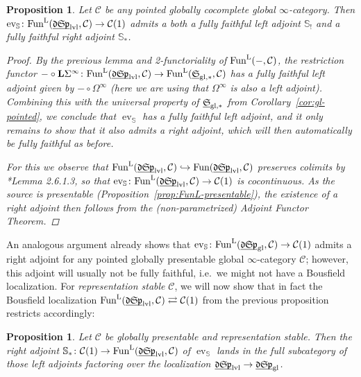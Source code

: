 \documentclass[reqno]{memo-l}
\theoremstyle{mythm}
\newtheorem{prop}[thm]{Proposition}
\theoremstyle{definition}
\numberwithin{equation}{section}
\newcommand{\Cc}{{\mathcal{C}}}
\newcommand{\gl}{\textup{gl}}
\DeclareMathOperator{\ev}{ev}
\newcommand{\Fun}{{\textup{Fun}}}
\newcommand{\cat}[1]{\textbf{\textup{#1}}}
\newcommand{\ulhelper}[2]{\underline{\setbox0=\hbox{$#1#2$}\dp0=0.4pt \box0\relax}}
\newcommand{\ul}[1]{{\mathpalette\ulhelper{#1}}\hbox{\rule[-2pt]{0pt}{0pt}}}
\newcommand{\mySp}{{\mathfrak S\kern-.5pt\mathfrak p}}
\newcommand{\myLSp}{{\mathfrak d\kern-.25pt}\mySp}
\newcommand{\ulmySplev}{\ul{\myLSp}_\textup{lvl}}
\newcommand{\myS}{{{\mathfrak S\kern-.4pt}}}
\begin{document}
\begin{prop}\label{prop:Sigma-oo-lev-ff}
    Let $\Cc$ be any pointed globally cocomplete global $\infty$-category. Then
    $\ev_{\mathbb S}\colon\Fun^\textup{L}(\ulmySplev,\Cc)\to\Cc(1)$ admits a both a fully faithful left adjoint $\mathbb S_!$ and a fully faithful right adjoint $\mathbb S_*$.
    \begin{proof}
        By the previous lemma and 2-functoriality of $\Fun^\text{L}(-,\Cc)$, the restriction functor $-\circ\cat{L}\Sigma^\infty\colon\Fun^\text{L}(\ulmySplev,\Cc)\to\Fun^\text{L}(\ul\myS_{\gl,*},\Cc)$ has a fully faithful left adjoint given by ${-}\circ\Omega^\infty$ (here we are using that $\Omega^\infty$ is also a \emph{left} adjoint). Combining this with the universal property of $\ul\myS_{\gl,*}$ from Corollary~\ref{cor:gl-pointed}, we conclude that $\ev_{\mathbb S}$ has a fully faithful left adjoint, and it only remains to show that it also admits a right adjoint, which will then automatically be fully faithful as before.

        For this we observe that $\Fun^\text{L}(\ulmySplev,\Cc)\hookrightarrow\Fun(\ulmySplev,\Cc)$ preserves colimits by \cite{martiniwolf2022presentable}*{Lemma 2.6.1.3}, so that $\ev_{\mathbb S}\colon\Fun^\text{L}(\ulmySplev,\Cc)\to\Cc(1)$ is cocontinuous. As the source is presentable (Proposition~\ref{prop:FunL-presentable}), the existence of a right adjoint then follows from the (non-parametrized) Adjoint Functor Theorem.
    \end{proof}
\end{prop}

An analogous argument already shows that $\ev_{\mathbb S}\colon\Fun^\text{L}(\ul\myLSp_\gl,\Cc)\to\Cc(1)$ admits a right adjoint for any pointed globally presentable global $\infty$-category $\Cc$; however, this adjoint will usually not be fully faithful, i.e.\ we might not have a Bousfield localization. For \emph{representation stable} $\Cc$, we will now show that in fact the Bousfield localization $\Fun^\text{L}(\ulmySplev,\Cc)\rightleftarrows\Cc(1)$ from the previous proposition restricts accordingly:

\begin{prop}\label{prop:RA-factor-through-LA}
    Let $\Cc$ be globally presentable and representation stable. Then the right adjoint $\mathbb S_*\colon\Cc(1)\to\Fun^\textup{L}(\ulmySplev,\Cc)$ of $\ev_{\mathbb S}$ lands in the full subcategory of those left adjoints factoring over the localization $\ulmySplev\to\ul\myLSp_\gl$.
\end{prop}
\end{document}
